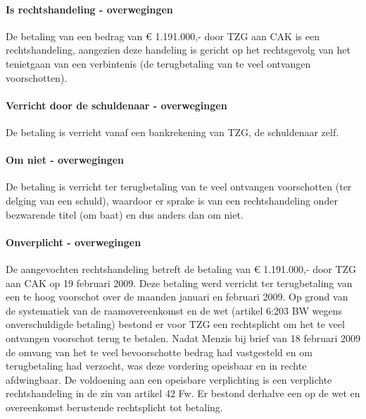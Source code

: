 \documentclass[
  dutch,
  a4paper,
]{article}
\begin{document}
\paragraph{Is rechtshandeling - overwegingen}\label{is-rechtshandeling---overwegingen-86}

De betaling van een bedrag van € 1.191.000,- door TZG aan CAK is een rechtshandeling, aangezien deze handeling is gericht op het rechtsgevolg van het tenietgaan van een verbintenis (de terugbetaling van te veel ontvangen voorschotten).

\paragraph{Verricht door de schuldenaar - overwegingen}\label{verricht-door-de-schuldenaar---overwegingen-86}

De betaling is verricht vanaf een bankrekening van TZG, de schuldenaar zelf.

\paragraph{Om niet - overwegingen}\label{om-niet---overwegingen-86}

De betaling is verricht ter terugbetaling van te veel ontvangen voorschotten (ter delging van een schuld), waardoor er sprake is van een rechtshandeling onder bezwarende titel (om baat) en dus anders dan om niet.

\paragraph{Onverplicht - overwegingen}\label{onverplicht---overwegingen-86}

De aangevochten rechtshandeling betreft de betaling van € 1.191.000,- door TZG aan CAK op 19 februari 2009. Deze betaling werd verricht ter terugbetaling van een te hoog voorschot over de maanden januari en februari 2009. Op grond van de systematiek van de raamovereenkomst en de wet (artikel 6:203 BW wegens onverschuldigde betaling) bestond er voor TZG een rechtsplicht om het te veel ontvangen voorschot terug te betalen. Nadat Menzis bij brief van 18 februari 2009 de omvang van het te veel bevoorschotte bedrag had vastgesteld en om terugbetaling had verzocht, was deze vordering opeisbaar en in rechte afdwingbaar. De voldoening aan een opeisbare verplichting is een verplichte rechtshandeling in de zin van artikel 42 Fw. Er bestond derhalve een op de wet en overeenkomst berustende rechtsplicht tot betaling.
\end{document}
